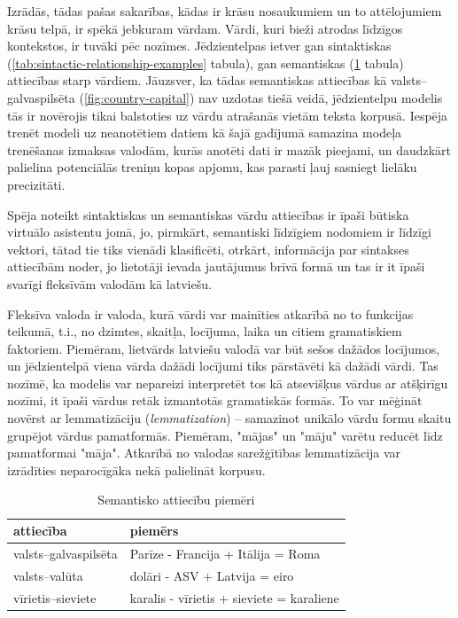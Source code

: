 Izrādās, tādas pašas sakarības, kādas ir krāsu nosaukumiem un to attēlojumiem krāsu telpā, ir spēkā jebkuram vārdam. Vārdi, kuri bieži atrodas līdzīgos kontekstos, ir tuvāki pēc nozīmes. Jēdzientelpas ietver gan sintaktiskas (\ref{tab:sintactic-relationship-examples} tabula), gan semantiskas (\ref{tab:semantic-relationship-examples} tabula) attiecības starp vārdiem. Jāuzsver, ka tādas semantiskas attiecības kā valsts--galvaspilsēta (\ref{fig:country-capital}) nav uzdotas tiešā veidā, jēdzientelpu modelis tās ir novērojis tikai balstoties uz vārdu atrašanās vietām teksta korpusā. Iespēja trenēt modeli uz neanotētiem datiem kā šajā gadījumā samazina modeļa trenēšanas izmaksas valodām, kurās anotēti dati ir mazāk pieejami, un daudzkārt palielina potenciālās treniņu kopas apjomu, kas parasti ļauj sasniegt lielāku precizitāti.

Spēja noteikt sintaktiskas un semantiskas vārdu attiecības ir īpaši būtiska virtuālo asistentu jomā, jo, pirmkārt, semantiski līdzīgiem nodomiem ir līdzīgi vektori, tātad tie tiks vienādi klasificēti, otrkārt, informācija par sintakses attiecībām noder, jo lietotāji ievada jautājumus brīvā formā un tas ir it īpaši svarīgi fleksīvām valodām kā latviešu.

Fleksīva valoda ir valoda, kurā vārdi var mainīties atkarībā no to funkcijas teikumā, t.i., no dzimtes, skaitļa, locījuma, laika un citiem gramatiskiem faktoriem. Piemēram, lietvārds latviešu valodā var būt sešos dažādos locījumos, un jēdzientelpā viena vārda dažādi locījumi tiks pārstāvēti kā dažādi vārdi. Tas nozīmē, ka modelis var nepareizi interpretēt tos kā atsevišķus vārdus ar atšķirīgu nozīmi, it īpaši vārdus retāk izmantotās gramatiskās formās. To var mēģināt novērst ar lemmatizāciju (\textit{lemmatization}) -- samazinot unikālo vārdu formu skaitu grupējot vārdus pamatformās. Piemēram, "mājas" un "māju" varētu reducēt līdz pamatformai "māja". Atkarībā no valodas sarežģītības lemmatizācija var izrādīties neparocīgāka nekā palielināt korpusu.


\begin{table}[htbp]
	\centering
	\caption{Semantisko attiecību piemēri \cite{word2vec2013}}
	\begin{tabular}{ll}\toprule
		attiecība & piemērs  \\\midrule
		valsts--galvaspilsēta   & Parīze - Francija + Itālija = Roma \\
		valsts--valūta   & dolāri - ASV + Latvija = eiro \\
		vīrietis--sieviete   & karalis - vīrietis + sieviete = karaliene \\\bottomrule
	\end{tabular}%
	\label{tab:semantic-relationship-examples}%
\end{table}

